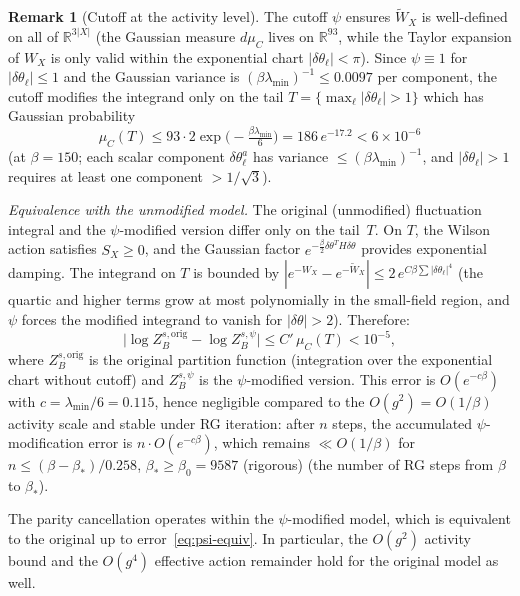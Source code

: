 \documentclass[11pt]{article}
\theoremstyle{definition}
\newtheorem{remark}[theorem]{Remark}
\newcommand{\R}{\mathbb{R}}
\begin{document}
\begin{remark}[Cutoff at the activity level]\label{rem:cutoff-activity}
The cutoff $\psi$ ensures $\widetilde{W}_X$ is well-defined on all
of $\R^{3|X|}$ (the Gaussian measure $d\mu_C$ lives on $\R^{93}$,
while the Taylor expansion of $W_X$ is only valid within the
exponential chart $|\delta\theta_\ell|<\pi$).  Since
$\psi\equiv 1$ for $|\delta\theta_\ell|\le 1$ and the Gaussian
variance is $(\beta\lambda_{\min})^{-1}\le 0.0097$ per component,
the cutoff modifies the integrand only on the tail
$T=\{\max_\ell|\delta\theta_\ell|>1\}$ which has Gaussian probability
\begin{equation}\label{eq:tail-prob}
\mu_C(T)\le 93\cdot 2\exp\bigl(-\tfrac{\beta\lambda_{\min}}{6}\bigr)
=186\,e^{-17.2}<6\times 10^{-6}
\end{equation}
(at $\beta=150$; each scalar component $\delta\theta_\ell^a$ has
variance $\le(\beta\lambda_{\min})^{-1}$, and
$|\delta\theta_\ell|>1$ requires at least one component $>1/\sqrt{3}$).

\emph{Equivalence with the unmodified model.}
The original (unmodified) fluctuation integral and the
$\psi$-modified version differ only on the tail~$T$.
On $T$, the Wilson action satisfies $S_X\ge 0$,
and the Gaussian factor $e^{-\frac{\beta}{2}\delta\theta^T H\delta\theta}$
provides exponential damping.  The integrand on $T$ is bounded by
$|e^{-W_X}-e^{-\widetilde{W}_X}|\le 2\,e^{C\beta\sum|\delta\theta_\ell|^4}$
(the quartic and higher terms grow at most polynomially in the
small-field region, and $\psi$ forces the modified integrand to
vanish for $|\delta\theta|>2$).  Therefore:
\begin{equation}\label{eq:psi-equiv}
\bigl|\log Z_B^{s,\mathrm{orig}}-\log Z_B^{s,\psi}\bigr|
\le C'\,\mu_C(T)<10^{-5},
\end{equation}
where $Z_B^{s,\mathrm{orig}}$ is the original partition function
(integration over the exponential chart without cutoff) and
$Z_B^{s,\psi}$ is the $\psi$-modified version.
This error is $O(e^{-c\beta})$ with $c=\lambda_{\min}/6=0.115$,
hence negligible compared to the $O(g^2)=O(1/\beta)$ activity
scale and stable under RG iteration: after $n$ steps,
the accumulated $\psi$-modification error is $n\cdot O(e^{-c\beta})$,
which remains $\ll O(1/\beta)$ for $n\le(\beta-\beta_*)/0.258$, $\beta_*\ge\beta_0=9587$ (rigorous)
(the number of RG steps from $\beta$ to $\beta_*$).

The parity cancellation operates within the $\psi$-modified model,
which is equivalent to the original up to error~\eqref{eq:psi-equiv}.
In particular, the $O(g^2)$ activity bound and the $O(g^4)$
effective action remainder hold for the original model as well.


\end{remark}
\end{document}
